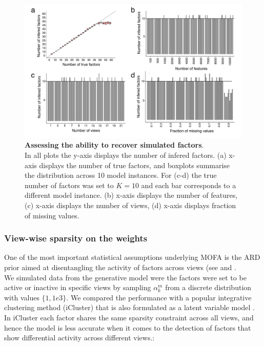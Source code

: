 \begin{figure}[H]
	\centering 	
	\includegraphics[width=1.0\textwidth]{MOFA_learnK}
	\caption{\textbf{Assessing the ability to recover simulated factors}.\\
	In all plots the y-axis displays the number of infered factors. (a) x-axis displays the number of true factors, and boxplots summarise the distribution across 10 model instances. For (c-d) the true number of factors was set to $K=10$ and each bar corresponds to a different model instance. (b) x-axis displays the number of features, (c) x-axis displays the number of views, (d) x-axis displays fraction of missing values. }
	\label{fig:MOFA_learnK}
\end{figure}

\subsubsection{View-wise sparsity on the weights}
One of the most important statistical assumptions underlying MOFA is the ARD prior aimed at disentangling the activity of factors across views (see  and .\\
We simulated data from the generative model were the factors were set to be active or inactive in specific views by sampling $\alpha_{k}^{m}$ from a discrete distribution with values $\{ 1, 1e3\}$. We compared the performance with a popular integrative clustering method (iCluster) that is also formulated as a latent variable model \cite{Mo2013}. In iCluster each factor shares the same sparsity constraint across all views, and hence the model is less accurate when it comes to the detection of factors that show differential activity across different views.:

